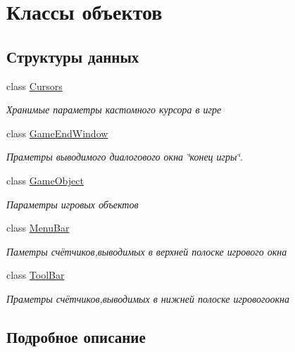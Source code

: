 \hypertarget{group__objectClasses}{}\section{Классы объектов}
\label{group__objectClasses}
\subsection*{Структуры данных}
\begin{DoxyCompactItemize}
\item 
class \hyperlink{classCursors}{Cursors}
\begin{DoxyCompactList}\small\item\em Хранимые параметры кастомного курсора в игре \end{DoxyCompactList}\item 
class \hyperlink{classGameEndWindow}{Game\+End\+Window}
\begin{DoxyCompactList}\small\item\em Праметры выводимого диалогового окна \char`\"{}конец игры\char`\"{}. \end{DoxyCompactList}\item 
class \hyperlink{classGameObject}{Game\+Object}
\begin{DoxyCompactList}\small\item\em Параметры игровых объектов \end{DoxyCompactList}\item 
class \hyperlink{classMenuBar}{Menu\+Bar}
\begin{DoxyCompactList}\small\item\em Паметры счётчиков,выводимых в верхней полоске игрового окна \end{DoxyCompactList}\item 
class \hyperlink{classToolBar}{Tool\+Bar}
\begin{DoxyCompactList}\small\item\em Праметры счётчиков,выводимых в нижней полоске игровогоокна \end{DoxyCompactList}\end{DoxyCompactItemize}


\subsection{Подробное описание}
